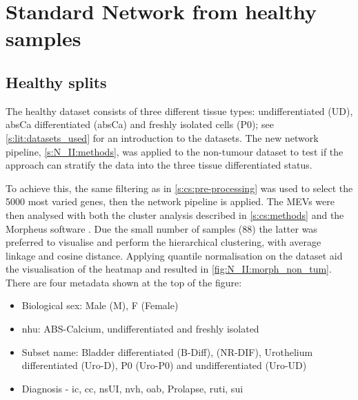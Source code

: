 \section{Standard Network from healthy samples}  \label{s:N_II:std_net}

\vspace{3mm}
\vspace{3mm}

\subsection{Healthy splits} \label{s:N_II:std}

The healthy dataset consists of three different tissue types: undifferentiated (UD), \acrshort{absCa} differentiated (\acrshort{absCa}) and freshly isolated cells (P0); see \cref{s:lit:datasets_used} for an introduction to the datasets. The new network pipeline, \cref{s:N_II:methods}, was applied to the non-tumour dataset to test if the approach can stratify the data into the three tissue differentiated status.

To achieve this, the same filtering as in \cref{s:cs:pre-processing} was used to select the 5000 most varied genes, then the network pipeline is applied. The MEVs were then analysed with both the cluster analysis described in \cref{s:cs:methods} and the Morpheus software \citep{Broad-Institute2016-tn}. Due the small number of samples (88) the latter was preferred to visualise and perform the hierarchical clustering, with average linkage and cosine distance. Applying quantile normalisation on the dataset aid the visualisation of the heatmap and resulted in \cref{fig:N_II:morph_non_tum}. There are four metadata shown at the top of the figure: 
\begin{itemize}
    \item Biological sex: Male (M), F (Female)
    \item \acrfull{nhu}: ABS-Calcium, undifferentiated and freshly isolated
    \item Subset name: Bladder differentiated (B-Diff), (NR-DIF), Urothelium differentiated (Uro-D), P0 (Uro-P0) and undifferentiated (Uro-UD)
    \item Diagnosis - \acrfull{ic}, \acrfull{cc}, \acrfull{nsUI},  \acrfull{nvh}, \acrfull{oab}, Prolapse, \acrfull{ruti}, \acrfull{sui}
\end{itemize} 

